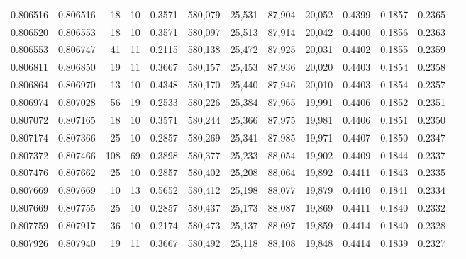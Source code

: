 \begin{tabular}{rrrrrrrrrrrrr}
0.806516 & 0.806516 &    18 &  10 &                                     0.3571 & 580,079 &  25,531 &  87,904 &  20,052 & 0.4399 & 0.1857 & 0.2365 \\
0.806520 & 0.806553 &    18 &  10 &                                     0.3571 & 580,097 &  25,513 &  87,914 &  20,042 & 0.4400 & 0.1856 & 0.2363 \\
0.806553 & 0.806747 &    41 &  11 &                                     0.2115 & 580,138 &  25,472 &  87,925 &  20,031 & 0.4402 & 0.1855 & 0.2359 \\
0.806811 & 0.806850 &    19 &  11 &                                     0.3667 & 580,157 &  25,453 &  87,936 &  20,020 & 0.4403 & 0.1854 & 0.2358 \\
0.806864 & 0.806970 &    13 &  10 &                                     0.4348 & 580,170 &  25,440 &  87,946 &  20,010 & 0.4403 & 0.1854 & 0.2357 \\
0.806974 & 0.807028 &    56 &  19 &                                     0.2533 & 580,226 &  25,384 &  87,965 &  19,991 & 0.4406 & 0.1852 & 0.2351 \\
0.807072 & 0.807165 &    18 &  10 &                                     0.3571 & 580,244 &  25,366 &  87,975 &  19,981 & 0.4406 & 0.1851 & 0.2350 \\
0.807174 & 0.807366 &    25 &  10 &                                     0.2857 & 580,269 &  25,341 &  87,985 &  19,971 & 0.4407 & 0.1850 & 0.2347 \\
0.807372 & 0.807466 &   108 &  69 &                                     0.3898 & 580,377 &  25,233 &  88,054 &  19,902 & 0.4409 & 0.1844 & 0.2337 \\
0.807476 & 0.807662 &    25 &  10 &                                     0.2857 & 580,402 &  25,208 &  88,064 &  19,892 & 0.4411 & 0.1843 & 0.2335 \\
0.807669 & 0.807669 &    10 &  13 &                                     0.5652 & 580,412 &  25,198 &  88,077 &  19,879 & 0.4410 & 0.1841 & 0.2334 \\
0.807669 & 0.807755 &    25 &  10 &                                     0.2857 & 580,437 &  25,173 &  88,087 &  19,869 & 0.4411 & 0.1840 & 0.2332 \\
0.807759 & 0.807917 &    36 &  10 &                                     0.2174 & 580,473 &  25,137 &  88,097 &  19,859 & 0.4414 & 0.1840 & 0.2328 \\
0.807926 & 0.807940 &    19 &  11 &                                     0.3667 & 580,492 &  25,118 &  88,108 &  19,848 & 0.4414 & 0.1839 & 0.2327 \\

\end{tabular}
